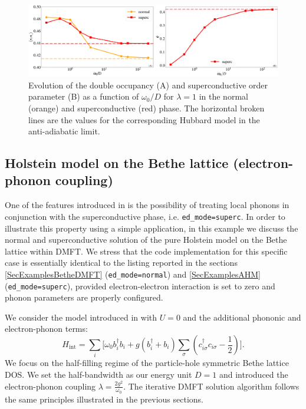 \documentclass[edipack_sp.tex]{subfiles}
\begin{document}
\begin{figure}[ht!]
    \includegraphics[width=\linewidth]{figures/figBethe_Holstein.pdf}
    \caption{\label{figEx5}
      Evolution of the double occupancy (A) and superconductive order parameter (B) as a function of $\omega_0/D$ for $\lambda=1$ in the normal (orange) and superconductive (red) phase. The horizontal broken lines are the values for the corresponding Hubbard model in the anti-adiabatic limit.}
\end{figure}

\subsection{Holstein model on the Bethe lattice (electron-phonon coupling)}

One of the features introduced in \NAME is the possibility of treating local phonons in conjunction with the superconductive phase,
i.e. {\tt ed\_mode=superc}. In order to illustrate this property using a simple application, in this example we discuss the normal and
superconductive solution of the pure Holstein model on the Bethe lattice within DMFT.
We stress that  the code
implementation for this specific case is essentially identical to the listing reported in the sections
\ref{SecExamplesBetheDMFT} ({\tt ed\_mode=normal}) and
\ref{SecExamplesAHM} ({\tt ed\_mode=superc}), provided electron-electron interaction is set to zero and phonon parameters are properly configured.  

We consider the model introduced in 
with $U=0$ and the additional phononic and electron-phonon terms:
\begin{equation} \label{eqex:H_Holstein}
    H_\mathrm{int} = \sum_i \Big[\omega_0 b^\dagger_i b_i + g(b^\dagger_i +
    b_i)\sum_{\sigma}\left(c^\dagger_{i\sigma}c_{i\sigma}
    -\frac{1}{2}\right)\Big]. 
\end{equation}
We focus on the half-filling regime of the particle-hole symmetric Bethe lattice DOS. We set the half-bandwidth as our energy unit $D=1$ and introduced the electron-phonon coupling $\lambda = \tfrac{2g^2}{\omega_0}$.  
The iterative DMFT solution algorithm follows the same principles illustrated in the previous sections. 
\end{document}
